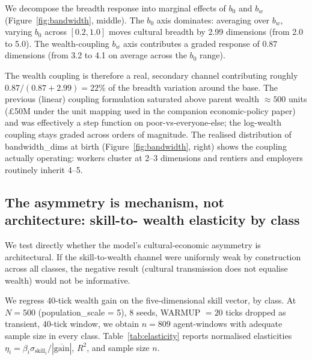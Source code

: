 \documentclass[11pt]{article}
\begin{document}
We decompose the breadth response into marginal effects of $b_0$
and $b_w$ (Figure~\ref{fig:bandwidth}, middle).
The $b_0$ axis dominates: averaging over $b_w$, varying $b_0$
across $[0.2, 1.0]$ moves cultural breadth by 2.99 dimensions
(from 2.0 to 5.0). The wealth-coupling $b_w$ axis contributes a
graded response of 0.87 dimensions (from 3.2 to 4.1 on average
across the $b_0$ range).

The wealth coupling is therefore a real, secondary channel
contributing roughly $0.87 / (0.87 + 2.99) = 22$\% of the breadth
variation around the base. The previous (linear) coupling formulation
saturated above parent wealth $\approx 500$ units (\pounds 50M
under the unit mapping used in the companion economic-policy paper)
and was effectively a step function on poor-vs-everyone-else; the
log-wealth coupling stays graded across orders of magnitude. The
realised distribution of bandwidth\_dims at birth
(Figure~\ref{fig:bandwidth}, right) shows the coupling actually
operating: workers cluster at 2--3 dimensions and rentiers and
employers routinely inherit 4--5.

\subsection{The asymmetry is mechanism, not architecture: skill-to-
wealth elasticity by class}
\label{sec:elasticity}

We test directly whether the model's cultural-economic asymmetry
is architectural. If the skill-to-wealth channel were uniformly
weak by construction across all classes, the negative result
(cultural transmission does not equalise wealth) would not be
informative.

We regress 40-tick wealth gain on the five-dimensional skill
vector, by class. At $N = 500$ (population\_scale = 5), 8 seeds,
WARMUP $= 20$ ticks dropped as transient, 40-tick window, we obtain
$n = 809$ agent-windows with adequate sample size in every class.
Table~\ref{tab:elasticity} reports normalised elasticities
$\eta_i = \beta_i \sigma_{\text{skill}_i} /
|\overline{\text{gain}}|$, $R^2$, and sample size $n$.
\end{document}
